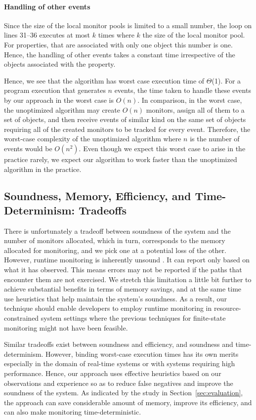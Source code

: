 \paragraph{Handling of other events}
Since the size of the local monitor pools is limited to a small number, the loop on lines 31--36
executes at most $k$ times where $k$ the size of the local monitor pool. For properties, that are
associated with only one object this number is one. Hence, the handling of other events takes a
constant time irrespective of the objects associated with the property.

Hence, we see that the algorithm has worst case execution time of
$\Theta$(1). For a program execution that  generates $n$ events, the time taken to handle 
these events by our approach in the worst case is $O(n)$. In comparison, in the worst case,
the unoptimized algorithm may create $O(n)$ monitors, assign all of them to a set of objects,
 and then receive events of similar kind on the same set of objects
 requiring all of the created monitors to be tracked for every event. Therefore, the worst-case complexity of the
 unoptimized algorithm where $n$ is the number of events would be $O(n^2)$. Even though we expect this worst case to arise 
 in the practice rarely, we expect our algorithm to work faster than the unoptimized algorithm in the practice.
 
\subsection{Soundness, Memory, Efficiency, and Time-Determinism: Tradeoffs}
\label{subsec:tradeoff}

There is unfortunately a tradeoff between soundness of the system and the
number of monitors allocated, which in turn, corresponds to the memory allocated
for monitoring, and we pick one at a potential loss of the other. However, runtime monitoring is inherently 
unsound \cite{}. It can report only based on what it has observed. This means errors 
may not be reported if the paths that encounter them are not exercised. We 
stretch this limitation a little bit further to achieve substantial benefits in 
terms of memory savings, and at the same time use heuristics that help maintain
the system's soundness.  As a result, our technique should enable developers to employ runtime 
monitoring in resource-constrained system settings where the previous 
techniques for finite-state monitoring might not have been feasible.

Similar tradeoffs exist between soundness and efficiency, and soundness and time-determinism.
However, binding worst-case execution times has its own merits 
especially in the domain of real-time systems or with systems requiring high performance.
Hence, our approach uses effective heuristics based on our observations and experience so as to reduce false 
negatives and improve the soundness of the system. As indicated by the study
in Section~\ref{sec:evaluation}, the approach can save considerable amount of
memory, improve its efficiency, and can also make monitoring time-deterministic.


